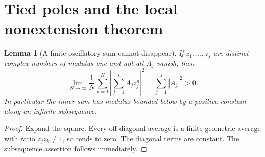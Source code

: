 \documentclass[11pt,a4paper]{article}
\numberwithin{equation}{section}
\newtheorem{lemma}[theorem]{Lemma}
\theoremstyle{definition}\newtheorem{definition}[theorem]{Definition}
\theoremstyle{remark}\newtheorem{remark}[theorem]{Remark}
\theoremstyle{definition}
\begin{document}
\section{Tied poles and the local nonextension theorem}
\label{sec:obstruction}
\begin{lemma}[A finite oscillatory sum cannot disappear]
\label{lem:cesaro}
If $z_1,\dots,z_s$ are distinct complex numbers of modulus one and not all
$A_j$ vanish, then
\begin{equation}
 \lim_{N\to\infty}\frac1N\sum_{n=1}^N
 \left|\sum_{j=1}^s A_jz_j^n\right|^2
 =\sum_{j=1}^s|A_j|^2>0.
 \label{eq:mean-square}
\end{equation}
In particular the inner sum has modulus bounded below by a positive constant
along an infinite subsequence.
\end{lemma}
\begin{proof}
Expand the square. Every off-diagonal average is a finite geometric average
with ratio $z_j\overline{z_k}\ne1$, so tends to zero. The diagonal terms are
constant. The subsequence assertion follows immediately.
\end{proof}
\end{document}
